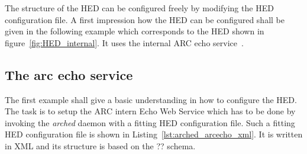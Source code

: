 The structure of the HED can be configured freely by modifying the HED configuration file. A first impression how the HED can be configured shall be given in the following example which corresponds to the HED shown in figure~\ref{fig:HED_internal}. It uses the internal ARC echo service~\cite{QIANG_2005}.



\subsection{The arc echo service}

The first example shall give a basic understanding in how to configure the HED. The task is to setup the ARC intern Echo Web Service which has to be done by invoking the \textit{arched} daemon with a fitting HED configuration file. Such a fitting HED configuration file is shown in Listing~\ref{lst:arched_arcecho_xml}. It is written in XML and its structure is based on the \textcolor{urgent}{??} schema.
\\

